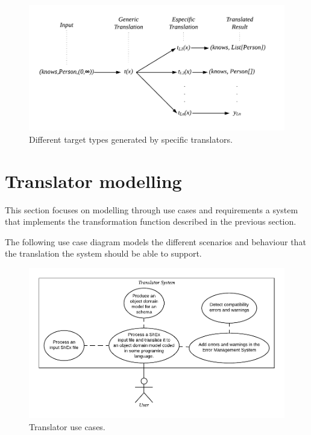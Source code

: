 \begin{figure}
    \includegraphics[scale=0.8]{images/lsc-diagram.pdf}
    \centering
	\caption[Different target types generated by specific translators]{Different target types generated by specific translators.}
    \label{fig:lst-diagram}
\end{figure}

\section{Translator modelling}
This section focuses on modelling through use cases and requirements
a system that implements the transformation function described in the
previous section.

The following use case diagram models the different scenarios and
behaviour that the translation the system should be able to support.
\begin{figure}[h!]
    \includegraphics[scale=0.8]{images/trans-use-case.pdf}
    \centering
    \caption[Translator use cases]{Translator use cases.}
    \label{fig:trans-use-case}
\end{figure}

